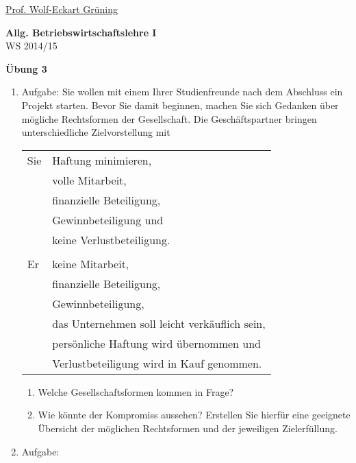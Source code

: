 \documentclass[12pt,a4paper]{scrreprt}
\begin{document}
 
\begin{flushleft}
\href{mailto:gruening@informatik.htw-dresden.de}{Prof. Wolf-Eckart Grüning}
\end{flushleft}

\begin{center}
\large{\textbf{ Allg. Betriebswirtschaftslehre I}} \\
WS 2014/15 \end{center}

\begin{center}\large{\textbf{ Übung 3 }} \end{center}

\bigskip
\begin{enumerate}%

 	\item{Aufgabe:}
 	Sie wollen mit einem Ihrer Studienfreunde nach dem Abschluss ein Projekt starten. Bevor Sie damit
beginnen, machen Sie sich Gedanken über mögliche Rechtsformen der Gesellschaft. Die
Geschäftspartner bringen unterschiedliche Zielvorstellung mit

	\begin{tabular}{ll}
	Sie 
		& Haftung minimieren, \\
		& volle Mitarbeit, \\
		& finanzielle Beteiligung, \\
		& Gewinnbeteiligung und \\
		& keine Verlustbeteiligung. \\
\\
	Er
		& keine Mitarbeit, \\
		& finanzielle Beteiligung, \\
		& Gewinnbeteiligung, \\
		& das Unternehmen soll leicht verkäuflich sein, \\
		& persönliche Haftung wird übernommen und \\
		& Verlustbeteiligung wird in Kauf genommen.
	\end{tabular}

	\begin{enumerate} 
		\item Welche Gesellschaftsformen kommen in Frage?
		\item Wie könnte der Kompromiss aussehen? Erstellen Sie hierfür eine geeignete Übersicht der
möglichen Rechtsformen und der jeweiligen Zielerfüllung.
	\end{enumerate} 

 	\item{Aufgabe:}


\end{enumerate}
\end{document}
